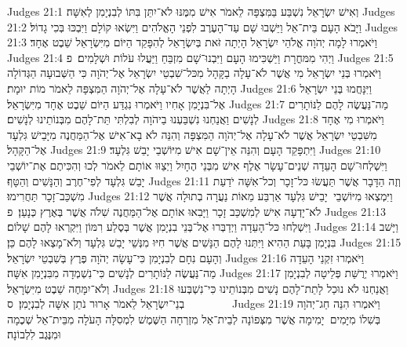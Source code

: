 Judges 21:1	וְאִישׁ יִשְׂרָאֵל נִשְׁבַּע בַּמִּצְפָּה לֵאמֹר אִישׁ מִמֶּנּוּ לֹא־יִתֵּן בִּתּוֹ לְבִנְיָמִן לְאִשָּׁה׃
Judges 21:2	וַיָּבֹא הָעָם בֵּית־אֵל וַיֵּשְׁבוּ שָׁם עַד־הָעֶרֶב לִפְנֵי הָאֱלֹהִים וַיִּשְׂאוּ קוֹלָם וַיִּבְכּוּ בְּכִי גָדוֹל׃
Judges 21:3	וַיֹּאמְרוּ לָמָה יְהֹוָה אֱלֹהֵי יִשְׂרָאֵל הָיְתָה זֹּאת בְּיִשְׂרָאֵל לְהִפָּקֵד הַיּוֹם מִיִּשְׂרָאֵל שֵׁבֶט אֶחָד׃
Judges 21:4	וַיְהִי מִמּחֳרָת וַיַּשְׁכִּימוּ הָעָם וַיִּבְנוּ־שָׁם מִזְבֵּחַ וַיַּעֲלוּ עֹלוֹת וּשְׁלָמִים׃ {פ}
Judges 21:5	וַיֹּאמְרוּ בְּנֵי יִשְׂרָאֵל מִי אֲשֶׁר לֹא־עָלָה בַקָּהָל מִכּל־שִׁבְטֵי יִשְׂרָאֵל אֶל־יְהֹוָה כִּי הַשְּׁבוּעָה הַגְּדוֹלָה הָיְתָה לַאֲשֶׁר לֹא־עָלָה אֶל־יְהֹוָה הַמִּצְפָּה לֵאמֹר מוֹת יוּמָת׃
Judges 21:6	וַיִּנָּחֲמוּ בְּנֵי יִשְׂרָאֵל אֶל־בִּנְיָמִן אָחִיו וַיֹּאמְרוּ נִגְדַּע הַיּוֹם שֵׁבֶט אֶחָד מִיִּשְׂרָאֵל׃
Judges 21:7	מַה־נַּעֲשֶׂה לָהֶם לַנּוֹתָרִים לְנָשִׁים וַאֲנַחְנוּ נִשְׁבַּעְנוּ בַיהֹוָה לְבִלְתִּי תֵּת־לָהֶם מִבְּנוֹתֵינוּ לְנָשִׁים׃
Judges 21:8	וַיֹּאמְרוּ מִי אֶחָד מִשִּׁבְטֵי יִשְׂרָאֵל אֲשֶׁר לֹא־עָלָה אֶל־יְהֹוָה הַמִּצְפָּה וְהִנֵּה לֹא בָא־אִישׁ אֶל־הַמַּחֲנֶה מִיָּבֵישׁ גִּלְעָד אֶל־הַקָּהָל׃
Judges 21:9	וַיִּתְפָּקֵד הָעָם וְהִנֵּה אֵין־שָׁם אִישׁ מִיּוֹשְׁבֵי יָבֵשׁ גִּלְעָד׃
Judges 21:10	וַיִּשְׁלְחוּ־שָׁם הָעֵדָה שְׁנֵים־עָשָׂר אֶלֶף אִישׁ מִבְּנֵי הֶחָיִל וַיְצַוּוּ אוֹתָם לֵאמֹר לְכוּ וְהִכִּיתֶם אֶת־יוֹשְׁבֵי יָבֵשׁ גִּלְעָד לְפִי־חֶרֶב וְהַנָּשִׁים וְהַטָּף׃
Judges 21:11	וְזֶה הַדָּבָר אֲשֶׁר תַּעֲשׂוּ כּל־זָכָר וְכל־אִשָּׁה יֹדַעַת מִשְׁכַּב־זָכָר תַּחֲרִימוּ׃
Judges 21:12	וַיִּמְצְאוּ מִיּוֹשְׁבֵי  יָבֵישׁ גִּלְעָד אַרְבַּע מֵאוֹת נַעֲרָה בְתוּלָה אֲשֶׁר לֹא־יָדְעָה אִישׁ לְמִשְׁכַּב זָכָר וַיָּבִאוּ אוֹתָם אֶל־הַמַּחֲנֶה שִׁלֹה אֲשֶׁר בְּאֶרֶץ כְּנָעַן׃ {פ}
Judges 21:13	וַיִּשְׁלְחוּ כּל־הָעֵדָה וַיְדַבְּרוּ אֶל־בְּנֵי בִנְיָמִן אֲשֶׁר בְּסֶלַע רִמּוֹן וַיִּקְרְאוּ לָהֶם שָׁלוֹם׃
Judges 21:14	וַיָּשׁב בִּנְיָמִן בָּעֵת הַהִיא וַיִּתְּנוּ לָהֶם הַנָּשִׁים אֲשֶׁר חִיּוּ מִנְּשֵׁי יָבֵשׁ גִּלְעָד וְלֹא־מָצְאוּ לָהֶם כֵּן׃
Judges 21:15	וְהָעָם נִחָם לְבִנְיָמִן כִּי־עָשָׂה יְהֹוָה פֶּרֶץ בְּשִׁבְטֵי יִשְׂרָאֵל׃
Judges 21:16	וַיֹּאמְרוּ זִקְנֵי הָעֵדָה מַה־נַּעֲשֶׂה לַנּוֹתָרִים לְנָשִׁים כִּי־נִשְׁמְדָה מִבִּנְיָמִן אִשָּׁה׃
Judges 21:17	וַיֹּאמְרוּ יְרֻשַּׁת פְּלֵיטָה לְבִנְיָמִן וְלֹא־יִמָּחֶה שֵׁבֶט מִיִּשְׂרָאֵל׃
Judges 21:18	וַאֲנַחְנוּ לֹא נוּכַל לָתֵת־לָהֶם נָשִׁים מִבְּנוֹתֵינוּ כִּי־נִשְׁבְּעוּ בְנֵי־יִשְׂרָאֵל לֵאמֹר אָרוּר נֹתֵן אִשָּׁה לְבִנְיָמִן׃ {ס}        
Judges 21:19	וַיֹּאמְרוּ הִנֵּה חַג־יְהֹוָה בְּשִׁלוֹ מִיָּמִים  יָמִימָה אֲשֶׁר מִצְּפוֹנָה לְבֵית־אֵל מִזְרְחָה הַשֶּׁמֶשׁ לִמְסִלָּה הָעֹלָה מִבֵּית־אֵל שְׁכֶמָה וּמִנֶּגֶב לִלְבוֹנָה׃
